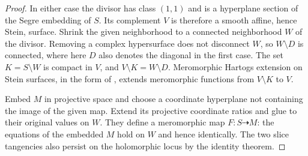 \begin{proof}
In either case the divisor has class $(1,1)$ and is a hyperplane
section of the Segre embedding of $S$. Its complement $V$ is therefore
a smooth affine, hence Stein, surface. Shrink the given neighborhood
to a connected neighborhood $W$ of the divisor. Removing a complex
hypersurface does not disconnect $W$, so $W\setminus D$ is connected,
where here $D$ also denotes the diagonal in the first case. The set
$K=S\setminus W$ is compact in $V$, and $V\setminus K=W\setminus D$.
Meromorphic Hartogs extension on Stein surfaces, in the form of
\cite[Theorem~2.2]{MP09}, extends meromorphic functions from
$V\setminus K$ to $V$.

Embed $M$ in projective space and choose a coordinate hyperplane not
containing the image of the given map. Extend its projective coordinate
ratios and glue to their original values on $W$. They define a
meromorphic map $F:S\dashrightarrow M$: the equations of the embedded
$M$ hold on $W$ and hence identically. The two slice tangencies also
persist on the holomorphic locus by the identity theorem.


\end{proof}
